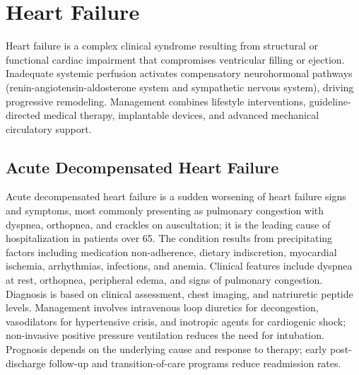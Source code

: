 \section{Heart Failure}




Heart failure is a complex clinical syndrome resulting from structural or functional cardiac impairment that compromises ventricular filling or ejection. Inadequate systemic perfusion activates compensatory neurohormonal pathways (renin-angiotensin-aldosterone system and sympathetic nervous system), driving progressive remodeling. Management combines lifestyle interventions, guideline-directed medical therapy, implantable devices, and advanced mechanical circulatory support.





\label{sec:Heart Failure}

\subsection{Acute Decompensated Heart Failure}
\label{sec:Acute Decompensated Heart Failure}
Acute decompensated heart failure is a sudden worsening of heart failure signs and symptoms, most commonly presenting as pulmonary congestion with dyspnea, orthopnea, and crackles on auscultation; it is the leading cause of hospitalization in patients over 65. The condition results from precipitating factors including medication non-adherence, dietary indiscretion, myocardial ischemia, arrhythmias, infections, and anemia. Clinical features include dyspnea at rest, orthopnea, peripheral edema, and signs of pulmonary congestion. Diagnosis is based on clinical assessment, chest imaging, and natriuretic peptide levels. Management involves intravenous loop diuretics for decongestion, vasodilators for hypertensive crisis, and inotropic agents for cardiogenic shock; non-invasive positive pressure ventilation reduces the need for intubation. Prognosis depends on the underlying cause and response to therapy; early post-discharge follow-up and transition-of-care programs reduce readmission rates.

